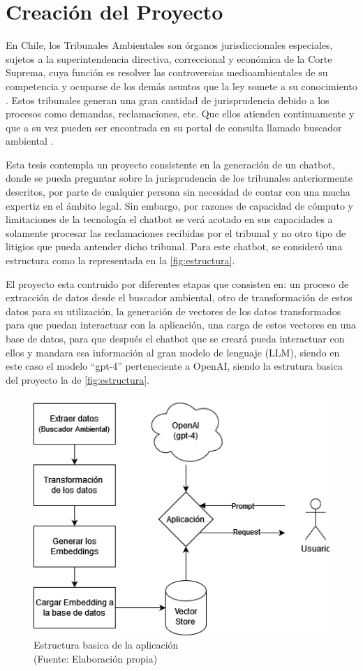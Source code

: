 

\chapter{Creación del Proyecto}


En Chile, los Tribunales Ambientales son órganos jurisdiccionales especiales, sujetos a la 
superintendencia directiva, correccional y económica de la Corte Suprema, cuya función 
es resolver las controversias medioambientales de su competencia y ocuparse de los 
demás asuntos que la ley somete a su conocimiento \cite{Ley20600}. Estos tribunales generan una gran cantidad 
de jurisprudencia debido a los procesos como demandas, reclamaciones, etc. Que ellos atienden continuamente 
y que a su vez pueden ser encontrada en su portal de consulta llamado buscador ambiental \cite{BuscadorAmbiental}. 

Esta tesis contempla un proyecto consistente en la generación de un chatbot, donde se pueda preguntar sobre 
la jurisprudencia de los tribunales anteriormente descritos, por parte de cualquier persona sin necesidad de 
contar con una mucha expertiz en el ámbito legal. Sin embargo, por razones de capacidad de cómputo y limitaciones 
de la tecnología el chatbot se 
verá acotado en sus capacidades a solamente procesar las reclamaciones recibidas por el tribunal y no otro tipo de 
litigios que pueda antender dicho tribunal. Para este chatbot, se consideró una estructura como 
la representada en la \autoref{fig:estructura}.

El proyecto esta contruido por diferentes etapas que consisten en: un proceso de extracción de datos 
desde el buscador ambiental, otro de transformación de estos datos para su utilización, la generación 
de vectores de los datos transformados para que puedan interactuar con la aplicación, una carga de estos vectores 
en una base de datos,  para que después el chatbot que se creará pueda interactuar con ellos y mandara 
esa información al gran modelo de lenguaje (LLM), siendo en este caso el modelo ``gpt-4'' perteneciente a OpenAI,
siendo la estrutura basica del proyecto la de \autoref{fig:estructura}.
\begin{figure}[ht!]
    \centering
    \includegraphics[width=.47\textwidth]{figures/huemul1.png}
    \caption[Estructura basica de la aplicación]{Estructura basica de la aplicación\\
    {\scriptsize (Fuente: Elaboración propia)}}
    \label{fig:estructura}
\end{figure}
    

